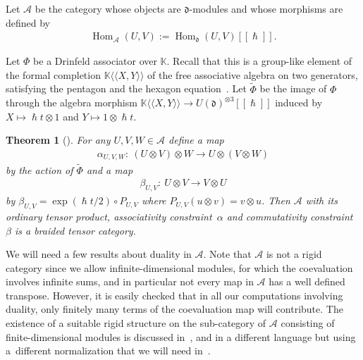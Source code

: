 \documentclass[11pt]{article}
\numberwithin{equation}{section}
\newcommand{\mf}[1]{\mathfrak{#1}}
\newcommand{\h}{\hslash}
\newcommand{\ot}{\otimes}
\newcommand{\cA}{\mathcal {A}}
\newcommand{\kk}{\mathbb K}
\renewcommand{\hom}{\operatorname{Hom}}
\newtheorem{thm}{Theorem}[section]
\theoremstyle{definition}
\begin{document}
Let $\cA$ be the category whose objects are $\mf d$-modules and whose morphisms are def\/ined by
\begin{gather*}
	\hom_\cA(U,V):=\hom_{\mf d}(U,V)[[\h]].
\end{gather*}

Let $\Phi$ be a Drinfeld associator over $\kk$. Recall that this is a group-like element of the formal completion $\kk\langle\langle X,Y\rangle\rangle$ of the free associative algebra on two generators, satisfying the pentagon and the hexagon equation~\cite{Drinfeld1990a}. Let $\tilde\Phi$ be the image of $\Phi$ through the algebra morphism $\kk\langle\langle X,Y\rangle\rangle \rightarrow U(\mf d)^{\ot 3}[[\h]]$ induced by $X\mapsto \h t\ot 1$ and $Y\mapsto 1\ot \h t$.
	\begin{thm}[\cite{Drinfeld1990,Drinfeld1990a}]
For any $U,V,W \in \cA$ define a map
\begin{gather*}
	\alpha_{U,V,W}\colon \ (U\ot V)\ot W \rightarrow U\ot (V \ot W)
\end{gather*}
by the action of $\tilde \Phi$ and a map
\begin{gather*}
	\beta_{U,V}\colon \ U\ot V \rightarrow V \ot U
\end{gather*}
by $\beta_{U,V}=\exp(\h t/2)\circ P_{U,V}$ where $P_{U,V}(u\ot v)=v\ot u$. Then $\cA$ with its ordinary tensor product, associativity constraint~$\alpha$ and commutativity constraint $\beta$ is a braided tensor category.
\end{thm}

We will need a few results about duality in $\cA$. Note that $\cA$ is not a rigid category since we allow inf\/inite-dimensional modules, for which the coevaluation involves inf\/inite sums, and in particular not every map in $\cA$ has a well def\/ined transpose. However, it is easily checked that in all our computations involving duality, only f\/initely many terms of the coevaluation map will contribute. The existence of a suitable rigid structure on the sub-category of $\cA$ consisting of f\/inite-dimensional modules is discussed in~\cite{Cartier1993,Drinfeld1990,Kassel1998}, and in a dif\/ferent language but using a~dif\/ferent normalization that we will need in~\cite{Le1995,Le1997}.
\end{document}
